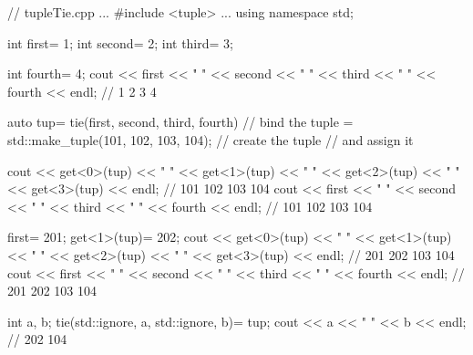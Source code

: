 
\begin{cpp}
// tupleTie.cpp
...
#include <tuple>
...
using namespace std;

int first= 1;
int second= 2;
int third= 3;

int fourth= 4;
cout << first << " " << second << " "
	 << third << " " << fourth << endl; // 1 2 3 4

auto tup= tie(first, second, third, fourth) // bind the tuple
		= std::make_tuple(101, 102, 103, 104); // create the tuple
												// and assign it

cout << get<0>(tup) << " " << get<1>(tup) << " " << get<2>(tup)
	 << " " << get<3>(tup) << endl; // 101 102 103 104
cout << first << " " << second << " " << third << " "
	 << fourth << endl; // 101 102 103 104

first= 201;
get<1>(tup)= 202;
cout << get<0>(tup) << " " << get<1>(tup) << " " << get<2>(tup)
	 << " " << get<3>(tup) << endl; // 201 202 103 104
cout << first << " " << second << " " << third << " "
	 << fourth << endl; // 201 202 103 104

int a, b;
tie(std::ignore, a, std::ignore, b)= tup;
cout << a << " " << b << endl; // 202 104
\end{cpp}








